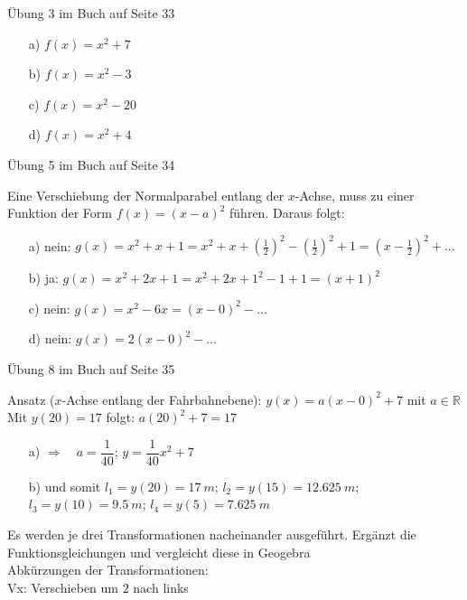 \documentclass[a4paper,ngerman,12pt]{exam}
\begin{document}
\begin{questions}
  \printanswers
  \question Übung 3 im Buch auf Seite 33
  \begin{solution}
    \begin{itemize}
      \item[a) ] $f(x)=x^2+7$
      \item[b) ] $f(x)=x^2-3$
      \item[c) ] $f(x)=x^2-20$
      \item[d) ] $f(x)=x^2+4$
    \end{itemize}
  \end{solution}
  \question Übung 5 im Buch auf Seite 34
  \begin{solution} Eine Verschiebung der Normalparabel entlang der $x$-Achse, muss zu einer Funktion der Form $f(x)=(x-a)^2$ führen. Daraus folgt:
    \begin{itemize}
      \item[a) ] nein: $g(x)=x^2+x+1=x^2+x+\left(\frac{1}{2}\right)^2-\left(\frac{1}{2}\right)^2+1= (x-\frac{1}{2})^2+...$
      \item[b) ] ja: $ g(x)=x^2+2x+1=x^2+2x+1^2-1+1= (x+1)^2$
      \item[c) ] nein: $g(x)=x^2-6x=(x-0)^2-...$
      \item[d) ] nein: $g(x)=2(x-0)^2-...$
    \end{itemize}
  \end{solution}
  \question Übung 8 im Buch auf Seite 35
  \begin{solution} Ansatz ($x$-Achse entlang der Fahrbahnebene): $y(x)=a(x-0)^2+7$ mit $a\in\mathbb{R}$\\[3ex]
    Mit $y(20)=17$ folgt: $a(20)^2+7=17$
    \begin{itemize}
      \item[a) ]  $\Rightarrow \quad a=\dfrac{1}{40}$; $y=\dfrac{1}{40}x^2+7$
      \item[b) ] und somit $l_1=y(20)=\SI{17}{m}$; $l_2=y(15)=\SI{12,625}{m}$; $l_3=y(10)=\SI{9,5}{m}$; $l_4=y(5)=\SI{7,625}{m}$
    \end{itemize}
  \end{solution}
  \question %
  Es werden je drei Transformationen nacheinander ausgeführt. Ergänzt die Funktionsgleichungen und vergleicht diese in Geogebra\\[2ex]
  Abkürzungen der Transformationen:\\
  Vx: Verschieben um $2$ nach links\\

\end{questions}
\end{document}
